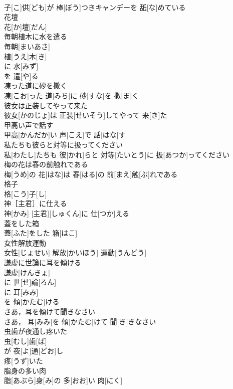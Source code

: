 \documentclass[8pt]{extreport}
\begin{document}
\begin{CJK}{UTF8}{min}
\\	子[こ]供[ども]が 棒[ぼう]つきキャンデーを 舐[な]めている
\\	花壇	
\\	花[か]壇[だん]
\\	毎朝植木に水を遣る	
\\	毎朝[まいあさ]
\\	植[うえ]木[き]
\\	に 水[みず]
\\	を 遣[や]る 
\\	凍った道に砂を撒く	
\\	凍[こお]った 道[みち]に 砂[すな]を 撒[ま]く
\\	彼女は正装してやって来た	
\\	彼女[かのじょ]は 正装[せいそう]してやって 来[き]た
\\	甲高い声で話す	
\\	甲高[かんだか]い 声[こえ]で 話[はな]す
\\	私たちも彼らと対等に扱ってください	
\\	私[わたし]たちも 彼[かれ]らと 対等[たいとう]に 扱[あつか]ってください
\\	梅の花は春の前触れである	
\\	梅[うめ]の 花[はな]は 春[はる]の 前[まえ]触[ぶ]れである
\\	格子	
\\	格[こう]子[し]
\\	神［主君］に仕える	
\\	神[かみ] [主君][しゅくん]に 仕[つか]える
\\	蓋をした箱	
\\	蓋[ふた]をした 箱[はこ]
\\	女性解放運動	
\\	女性[じょせい] 解放[かいほう] 運動[うんどう]
\\	謙虚に世論に耳を傾ける	
\\	謙虚[けんきょ]
\\	に 世[せ]論[ろん]
\\	に 耳[みみ]
\\	を 傾[かたむ]ける 
\\	さあ，耳を傾けて聞きなさい	
\\	さあ， 耳[みみ]を 傾[かたむ]けて 聞[き]きなさい
\\	虫歯が夜通し疼いた	
\\	虫[むし]歯[ば]
\\	が 夜[よ]通[どお]し 
\\	疼[うず]いた 
\\	脂身の多い肉	
\\	脂[あぶら]身[み]の 多[おお]い 肉[にく]

\end{CJK}
\end{document}
